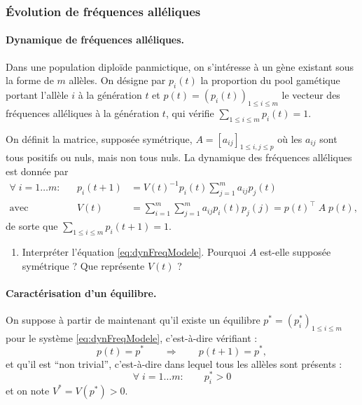 \subsubsection{\'Evolution de fréquences alléliques}

\paragraph{Dynamique de fréquences alléliques.}
Dans une population diploïde panmictique, on s’intéresse à un gène existant sous la forme de $m$ allèles. On désigne par $p_i(t)$ la proportion du pool gamétique portant l’allèle $i$  à la génération $t$ et $p(t) = (p_i(t))_{1 \leq i \leq m}$ le vecteur des fréquences alléliques à la génération $t$, qui vérifie $\sum_{1 \leq i \leq m}p_i(t) = 1$. 

On définit la matrice, supposée symétrique, $A = [a_{ij}]_{1 \leq i, j \leq p}$ où les $a_{ij}$ sont tous positifs ou nuls, mais non tous nuls. La dynamique des fréquences alléliques est donnée par
\begin{align} \label{eq:dynFreqModele}
  \forall \; i = 1 \dots m: & & 
  p_i(t+1) & = V(t)^{-1} p_i(t) \sum_{j=1}^m a_{ij} p_j(t) \\
  \text{avec} & & 
  V(t) & = \sum_{i=1}^m \sum_{j=1}^m a_{ij} p_i(t) p_j(j) = p(t)^\top \; A \; p(t), \nonumber
\end{align}
de sorte que $\sum_{1 \leq i \leq m} p_i(t+1) = 1$.

\bigskip
\begin{enumerate}
  \item Interpréter l'équation \eqref{eq:dynFreqModele}. Pourquoi $A$ est-elle supposée symétrique ? Que représente $V(t)$ ?
\end{enumerate}

\bigskip
\paragraph{Caractérisation d'un équilibre.}
On suppose à partir de maintenant qu'il existe un équilibre $p^* = (p^*_i)_{1 \leq i \leq m}$ pour le système \eqref{eq:dynFreqModele}, c'est-à-dire vérifiant : 
$$
p(t) = p^* \qquad \Rightarrow \qquad p(t+1) = p^*,
$$
et qu'il est ``non trivial'', c'est-à-dire dans lequel tous les allèles sont présents : 
$$
\forall \; i = 1 \dots m: \qquad p^*_i > 0
$$
et on note $V^* = V(p^*) > 0$.


